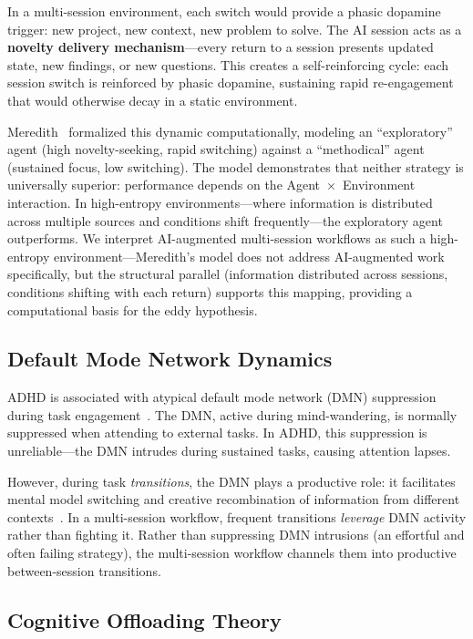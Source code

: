 \documentclass[sigconf,nonacm]{acmart}
\begin{document}
In a multi-session environment, each switch would provide a phasic dopamine trigger: new project, new context, new problem to solve. The AI session acts as a \textbf{novelty delivery mechanism}---every return to a session presents updated state, new findings, or new questions. This creates a self-reinforcing cycle: each session switch is reinforced by phasic dopamine, sustaining rapid re-engagement that would otherwise decay in a static environment.

Meredith~\cite{meredith2025} formalized this dynamic computationally, modeling an ``exploratory'' agent (high novelty-seeking, rapid switching) against a ``methodical'' agent (sustained focus, low switching). The model demonstrates that neither strategy is universally superior: performance depends on the Agent~$\times$~Environment interaction. In high-entropy environments---where information is distributed across multiple sources and conditions shift frequently---the exploratory agent outperforms. We interpret AI-augmented multi-session workflows as such a high-entropy environment---Meredith's model does not address AI-augmented work specifically, but the structural parallel (information distributed across sessions, conditions shifting with each return) supports this mapping, providing a computational basis for the eddy hypothesis.

\subsection{Default Mode Network Dynamics}

ADHD is associated with atypical default mode network (DMN) suppression during task engagement~\cite{castellanos2016}. The DMN, active during mind-wandering, is normally suppressed when attending to external tasks. In ADHD, this suppression is unreliable---the DMN intrudes during sustained tasks, causing attention lapses.

However, during task \emph{transitions}, the DMN plays a productive role: it facilitates mental model switching and creative recombination of information from different contexts~\cite{christoff2016}. In a multi-session workflow, frequent transitions \emph{leverage} DMN activity rather than fighting it. Rather than suppressing DMN intrusions (an effortful and often failing strategy), the multi-session workflow channels them into productive between-session transitions.

\subsection{Cognitive Offloading Theory}
\end{document}

